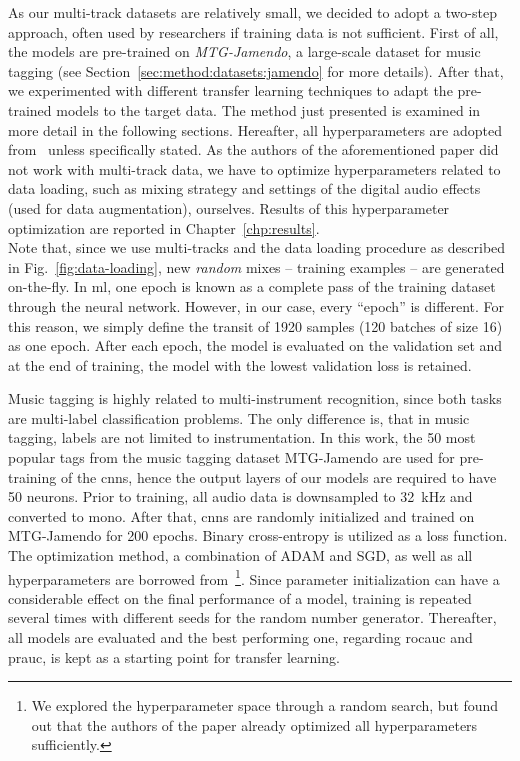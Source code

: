 As our multi-track datasets are relatively small, we decided to adopt a two-step approach, often used by researchers if training data is not sufficient. First of all, the models are pre-trained on \textit{MTG-Jamendo}, a large-scale dataset for music tagging (see Section~\ref{sec:method:datasets:jamendo} for more details). After that, we experimented with different transfer learning techniques to adapt the pre-trained models to the target data. The method just presented is examined in more detail in the following sections. Hereafter, all hyperparameters are adopted from~\cite{won2020evaluation} unless specifically stated. As the authors of the aforementioned paper did not work with multi-track data, we have to optimize hyperparameters related to data loading, such as mixing strategy and settings of the digital audio effects (used for data augmentation), ourselves. Results of this hyperparameter optimization are reported in Chapter~\ref{chp:results}.\\

Note that, since we use multi-tracks and the data loading procedure as described in Fig.~\ref{fig:data-loading}, new \textit{random} mixes -- training examples -- are generated on-the-fly. In \gls{ml}, one epoch is known as a complete pass of the training dataset through the neural network. However, in our case, every \enquote{epoch} is different. For this reason, we simply define the transit of 1920 samples (120 batches of size 16) as one epoch. After each epoch, the model is evaluated on the validation set and at the end of training, the model with the lowest validation loss is retained.

Music tagging is highly related to multi-instrument recognition, since both tasks are multi-label classification problems. The only difference is, that in music tagging, labels are not limited to instrumentation. In this work, the 50 most popular tags from the music tagging dataset MTG-Jamendo are used for pre-training of the \glspl{cnn}, hence the output layers of our models are required to have 50 neurons. Prior to training, all audio data is downsampled to \SI{32}{\kilo\hertz} and converted to mono. After that, \glspl{cnn} are randomly initialized and trained on MTG-Jamendo for 200 epochs. Binary cross-entropy is utilized as a loss function. The optimization method, a combination of ADAM and SGD, as well as all hyperparameters are borrowed from~\cite{won2020evaluation}\footnote{We explored the hyperparameter space through a random search, but found out that the authors of the paper already optimized all hyperparameters sufficiently.}. Since parameter initialization can have a considerable effect on the final performance of a model, training is repeated several times with different seeds for the random number generator. Thereafter, all models are evaluated and the best performing one, regarding \gls{rocauc} and \gls{prauc}, is kept as a starting point for transfer learning.

